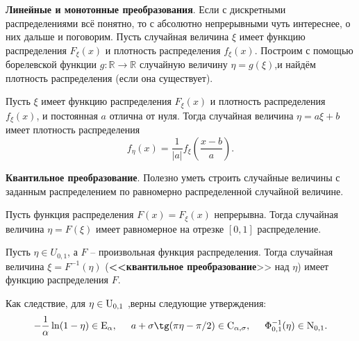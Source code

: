 \textbf{Линейные и монотонные преобразования}.
Если с дискретными распределениями всё понятно, то с абсолютно непрерывными чуть интереснее,  о них дальше и поговорим. Пусть случайная величина $\xi$ имеет функцию распределения $F_\xi (x)$ и плотность распределения $f_\xi (x)$. Построим с помощью борелевской функции $g \colon \mathbb{R} \to \mathbb{R}$ случайную величину $\eta = g(\xi)$,и найдём плотность распределения (если она существует). 

\begin{to_thr}[]
    Пусть $\xi$ имеет функцию распределения $F_\xi (x)$ и плотность распределения $f_\xi (x)$, и постоянная $a$ отлична от нуля. Тогда случайная величина $\eta = a \xi + b$ имеет плотность распределения
    \begin{equation*}
        f_\eta (x) = \frac{1}{|a|} f_\xi \left(
            \frac{x-b}{a}
        \right).
    \end{equation*}
\end{to_thr}


\textbf{Квантильное преобразование}. Полезно уметь строить случайные величины с заданным распределением по равномерно распределенной случайной величине.

\begin{to_thr}[]
    Пусть функция распределения $F(x) = F_\xi (x)$ непрерывна. Тогда случайная величина $\eta = F(\xi)$ имеет равномерное на отрезке $[0, 1]$ распределение. 
\end{to_thr}

\begin{to_thr}
    Пусть $\eta \in U_{0, 1}$, а $F$ -- произвольная функция распределения. Тогда случайная величина $\xi = F^{-1} (\eta)$ (\textbf{<<квантильное преобразование}>>  над $\eta$) имеет функцию распределения $F$. 
\end{to_thr}

\noindent
Как следствие,
для $\eta \in \textnormal{U}_{0, 1}$
,верны следующие утверждения:
\begin{equation*}
    - \frac{1}{\alpha} \ln (1 - \eta) \in \textnormal{E}_\alpha, 
    \hspace{5 mm}  
    a + \sigma \tg (\pi \eta - \pi / 2) \in \textnormal{C}_{\alpha, \sigma},
    \hspace{5 mm}
    \Phi_{0, 1}^{-1} (\eta) \in \textnormal{N}_{0, 1}.
\end{equation*}